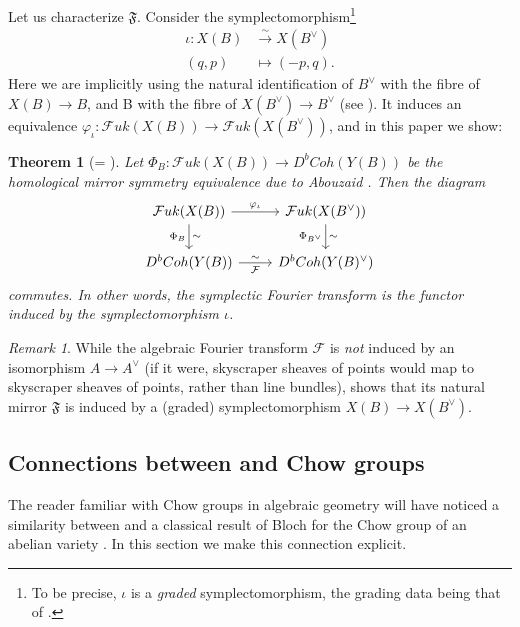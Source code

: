 \documentclass[10pt]{amsart}
\newcounter{mainthm}
\newtheorem{mainthm}[mainthm]{Theorem}
\theoremstyle{definition}
\theoremstyle{remark}
\newtheorem{remark}[thm]{Remark}
\newcommand{\mcal}{\mathcal}
\newcommand{\xra}[1]{\xrightarrow{#1}}
\begin{document}
Let us characterize $\mathfrak F$.
Consider the symplectomorphism\footnote{To be precise, $\iota$ is a \emph{graded} symplectomorphism, the grading data being that of .}
\begin{align*}
    \iota: X(B) &\xra{\sim} X(B^\vee) \\
    (q,p) &\mapsto (-p,q).
\end{align*}
Here we  are implicitly using the natural identification of $B^\vee$ with the fibre of $X(B) \to B$, and B with the fibre of $X(B^\vee) \to B^\vee$ (see ).
It induces an equivalence  $\varphi_\iota:\mcal Fuk(X(B)) \to \mcal Fuk(X(B^\vee))$, and in this paper we show:
\begin{mainthm}[= ]\label{mainthm:symplecticfourier}
    Let $\Phi_B : \mcal Fuk(X(B)) \to D^bCoh(Y(B))$ be the homological mirror symmetry equivalence due to Abouzaid \cite{abouzaid2021homological}.
    Then the diagram
    $$
    \begin{tikzcd}
        \mcal Fuk(X(B)) \arrow[r,"\varphi_\iota"] \arrow[d,"\sim","\Phi_B"'] & \mcal Fuk(X(B^\vee)) \arrow[d,"\sim","\Phi_{B^\vee}"']\\
        D^bCoh(Y(B)) \arrow[r,"\sim","\mcal F"'] & D^bCoh(Y(B)^\vee) 
    \end{tikzcd}
    $$
    commutes.
    In other words, the symplectic Fourier transform is the functor induced by the symplectomorphism $\iota$.
\end{mainthm}

\begin{remark}
    While the algebraic Fourier transform $\mcal F$ is \emph{not} induced by an isomorphism $A \to A^\vee$ (if it were, skyscraper sheaves of points would map to skyscraper sheaves of points, rather than line bundles),  shows that its natural mirror $\mathfrak F$ is induced by a (graded) symplectomorphism $X(B) \to X(B^\vee)$.
\end{remark}






\subsection{Connections between  and Chow groups}\label{sec:connections_ag}
The reader familiar with Chow groups in algebraic geometry will have noticed a similarity between  and a classical result of Bloch for the Chow group of an abelian variety \cite{bloch1976some}. 
In this section we make this connection explicit.
\end{document}
